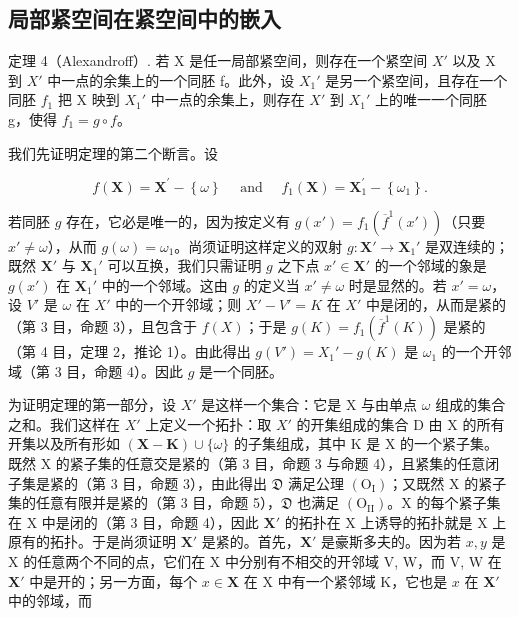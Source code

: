 \subsection{局部紧空间在紧空间中的嵌入}

定理 4（Alexandroff）. 若 X 是任一局部紧空间，则存在一个紧空间 \(X'\) 以及 X 到 \(X'\) 中一点的余集上的一个同胚 f。此外，设 \(X_{1}'\) 是另一个紧空间，且存在一个同胚 \(f_{1}\) 把 X 映到 \(X_{1}'\) 中一点的余集上，则存在 \(X'\) 到 \(X_{1}'\) 上的唯一一个同胚 g，使得 \(f_{1}=g\circ f\)。

我们先证明定理的第二个断言。设

\[
f (\mathbf {X}) = \mathbf {X} ^ {\prime} - \left\{\omega \right\} \quad \text { and } \quad f _ {1} (\mathbf {X}) = \mathbf {X} _ {1} ^ {\prime} - \left\{\omega_ {1} \right\}.
\]

若同胚 \(g\) 存在，它必是唯一的，因为按定义有 \(g(x') = f_1(\overline{f}^1 (x'))\)（只要 \(x' \neq \omega\)），从而 \(g(\omega) = \omega_1\)。尚须证明这样定义的双射 \(g: \mathbf{X}' \to \mathbf{X}_1'\) 是双连续的；既然 \(\mathbf{X}'\) 与 \(\mathbf{X}_1'\) 可以互换，我们只需证明 \(g\) 之下点 \(x' \in \mathbf{X}'\) 的一个邻域的象是 \(g(x')\) 在 \(\mathbf{X}_1'\) 中的一个邻域。这由 \(g\) 的定义当 \(x' \neq \omega\) 时是显然的。若 \(x' = \omega\)，设 \(V'\) 是 \(\omega\) 在 \(X'\) 中的一个开邻域；则 \(X' - V' = K\) 在 \(X'\) 中是闭的，从而是紧的（第 3 目，命题 3），且包含于 \(f(X)\)；于是 \(g(K) = f_1(\overline{f}^1 (K))\) 是紧的（第 4 目，定理 2，推论 1）。由此得出 \(g(V') = X_1' - g(K)\) 是 \(\omega_1\) 的一个开邻域（第 3 目，命题 4）。因此 \(g\) 是一个同胚。

为证明定理的第一部分，设 \(X'\) 是这样一个集合：它是 X 与由单点 \(\omega\) 组成的集合之和。我们这样在 \(X'\) 上定义一个拓扑：取 \(X'\) 的开集组成的集合 D 由 X 的所有开集以及所有形如 \((\mathbf{X}-\mathbf{K})\cup\{\omega\}\) 的子集组成，其中 K 是 X 的一个紧子集。既然 X 的紧子集的任意交是紧的（第 3 目，命题 3 与命题 4），且紧集的任意闭子集是紧的（第 3 目，命题 3），由此得出 \(\mathfrak{D}\) 满足公理 \((\mathrm{O_I})\)；又既然 X 的紧子集的任意有限并是紧的（第 3 目，命题 5），\(\mathfrak{D}\) 也满足 \((\mathrm{O_{II}})\)。X 的每个紧子集在 X 中是闭的（第 3 目，命题 4），因此 \(\mathbf{X}'\) 的拓扑在 X 上诱导的拓扑就是 X 上原有的拓扑。于是尚须证明 \(\mathbf{X}'\) 是紧的。首先，\(\mathbf{X}'\) 是豪斯多夫的。因为若 \(x, y\) 是 X 的任意两个不同的点，它们在 X 中分别有不相交的开邻域 V, W，而 V, W 在 \(\mathbf{X}'\) 中是开的；另一方面，每个 \(x \in \mathbf{X}\) 在 X 中有一个紧邻域 K，它也是 \(x\) 在 \(\mathbf{X}'\) 中的邻域，而

